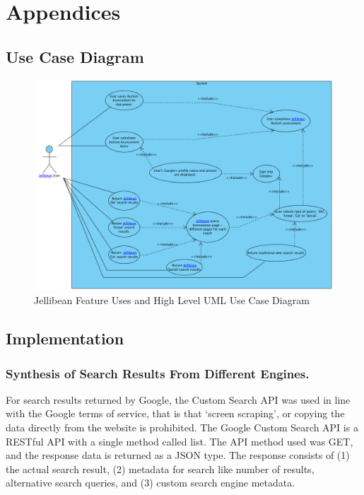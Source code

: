\documentclass[a4paper, 11pt]{article}
\begin{document}
\newpage
\section {Appendices}

\newpage
\subsection{Use Case Diagram}\label{JBeanUseCaseA}

\begin{figure}[H]
\begin{center}
\includegraphics[scale=0.40]{JBeanUseCase}
\caption{Jellibean Feature Uses and High Level UML Use Case Diagram}
\label{JBeanUseCase}
\end{center}
\end{figure}


\newpage

\subsection{Implementation}\label{implementation}

\subsubsection{Synthesis of Search Results From Different Engines.}
For search results returned by Google, the Custom Search API was used in line with the Google terms of service, that is that `screen scraping', or copying the data directly from the website is prohibited. The Google Custom Search API is a RESTful API with a single method called list. The API method used was GET, and the response data is returned as a JSON type. The response consists of (1) the actual search result, (2) metadata for search like number of results, alternative search queries, and (3) custom search engine metadata. 
\end{document}
